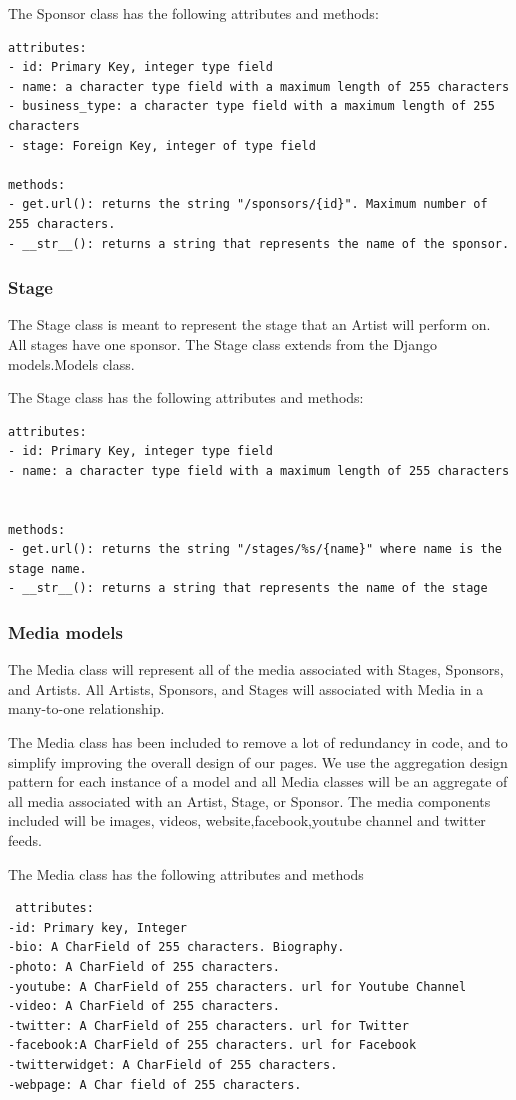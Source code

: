 \documentclass[12pt,english]{scrartcl}
\begin{document}
The Sponsor class has the following attributes and methods:
\begin{verbatim}
attributes:
- id: Primary Key, integer type field
- name: a character type field with a maximum length of 255 characters
- business_type: a character type field with a maximum length of 255 characters
- stage: Foreign Key, integer of type field

methods:
- get.url(): returns the string "/sponsors/{id}". Maximum number of 255 characters.
- __str__(): returns a string that represents the name of the sponsor.
\end{verbatim}

\subsubsection{Stage}

The Stage class is meant to represent the stage that an Artist will perform on. All stages
have one sponsor. The Stage class extends from the Django models.Models class.

The Stage class has the following attributes and methods:
\begin{verbatim}
attributes:
- id: Primary Key, integer type field
- name: a character type field with a maximum length of 255 characters


methods:
- get.url(): returns the string "/stages/%s/{name}" where name is the stage name.
- __str__(): returns a string that represents the name of the stage
\end{verbatim}

\subsubsection{Media models}

The Media class will represent all of the media associated with Stages, Sponsors, and Artists. All Artists, Sponsors, and Stages will associated
with Media in a many-to-one relationship.

The Media class has been included to remove a lot of redundancy in code, and to simplify improving the overall 
design of our pages. We use the aggregation design pattern for each instance of a model and all Media classes will be an aggregate of all media
associated with an Artist, Stage, or Sponsor. The media components included will be images, videos, website,facebook,youtube channel and twitter feeds.

The Media class has the following attributes and methods
\begin{verbatim}
 attributes:
-id: Primary key, Integer
-bio: A CharField of 255 characters. Biography. 
-photo: A CharField of 255 characters. 
-youtube: A CharField of 255 characters. url for Youtube Channel
-video: A CharField of 255 characters.
-twitter: A CharField of 255 characters. url for Twitter
-facebook:A CharField of 255 characters. url for Facebook
-twitterwidget: A CharField of 255 characters.
-webpage: A Char field of 255 characters.
\end{verbatim}
\end{document}
